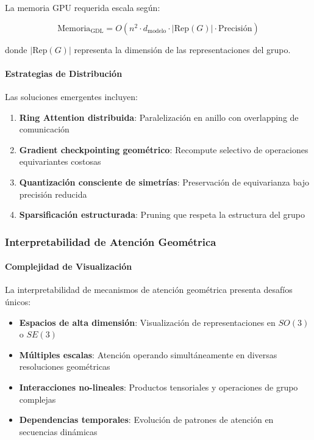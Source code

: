 La memoria GPU requerida escala según:

\begin{equation}
\text{Memoria}_{\text{GDL}} = O(n^2 \cdot d_{\text{modelo}} \cdot |\text{Rep}(G)| \cdot \text{Precisión})
\label{eq:gdl_memory_scaling}
\end{equation}

donde $|\text{Rep}(G)|$ representa la dimensión de las representaciones del grupo.

\paragraph{Estrategias de Distribución}

Las soluciones emergentes incluyen:

\begin{enumerate}
    \item \textbf{Ring Attention distribuida}: Paralelización en anillo con overlapping de comunicación
    \item \textbf{Gradient checkpointing geométrico}: Recompute selectivo de operaciones equivariantes costosas
    \item \textbf{Quantización consciente de simetrías}: Preservación de equivarianza bajo precisión reducida
    \item \textbf{Sparsificación estructurada}: Pruning que respeta la estructura del grupo
\end{enumerate}

\subsubsection{Interpretabilidad de Atención Geométrica}

\paragraph{Complejidad de Visualización}

La interpretabilidad de mecanismos de atención geométrica presenta desafíos únicos:

\begin{itemize}
    \item \textbf{Espacios de alta dimensión}: Visualización de representaciones en $SO(3)$ o $SE(3)$
    \item \textbf{Múltiples escalas}: Atención operando simultáneamente en diversas resoluciones geométricas
    \item \textbf{Interacciones no-lineales}: Productos tensoriales y operaciones de grupo complejas
    \item \textbf{Dependencias temporales}: Evolución de patrones de atención en secuencias dinámicas
\end{itemize}

